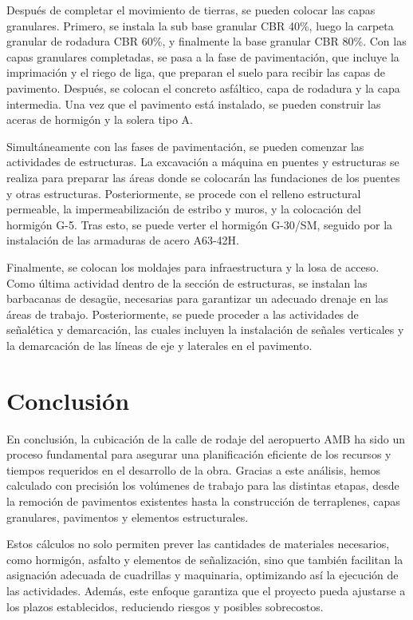 \documentclass{article} %
\begin{document}
Después de completar el movimiento de tierras, se pueden colocar las capas granulares. Primero, se instala la sub base granular CBR 40\%, luego la carpeta granular de rodadura CBR 60\%, y finalmente la base granular CBR 80\%. Con las capas granulares completadas, se pasa a la fase de pavimentación, que incluye la imprimación y el riego de liga, que preparan el suelo para recibir las capas de pavimento. Después, se colocan el concreto asfáltico, capa de rodadura y la capa intermedia. Una vez que el pavimento está instalado, se pueden construir las aceras de hormigón y la solera tipo A.

Simultáneamente con las fases de pavimentación, se pueden comenzar las actividades de estructuras. La excavación a máquina en puentes y estructuras se realiza para preparar las áreas donde se colocarán las fundaciones de los puentes y otras estructuras. Posteriormente, se procede con el relleno estructural permeable, la impermeabilización de estribo y muros, y la colocación del hormigón G-5. Tras esto, se puede verter el hormigón G-30/SM, seguido por la instalación de las armaduras de acero A63-42H.

Finalmente, se colocan los moldajes para infraestructura y la losa de acceso. Como última actividad dentro de la sección de estructuras, se instalan las barbacanas de desagüe, necesarias para garantizar un adecuado drenaje en las áreas de trabajo. Posteriormente, se puede proceder a las actividades de señalética y demarcación, las cuales incluyen la instalación de señales verticales y la demarcación de las líneas de eje y laterales en el pavimento.

\newpage
\section{Conclusión}

En conclusión, la cubicación de la calle de rodaje del aeropuerto AMB ha sido un proceso fundamental para asegurar una planificación eficiente de los recursos y tiempos requeridos en el desarrollo de la obra. Gracias a este análisis, hemos calculado con precisión los volúmenes de trabajo para las distintas etapas, desde la remoción de pavimentos existentes hasta la construcción de terraplenes, capas granulares, pavimentos y elementos estructurales.

Estos cálculos no solo permiten prever las cantidades de materiales necesarios, como hormigón, asfalto y elementos de señalización, sino que también facilitan la asignación adecuada de cuadrillas y maquinaria, optimizando así la ejecución de las actividades. Además, este enfoque garantiza que el proyecto pueda ajustarse a los plazos establecidos, reduciendo riesgos y posibles sobrecostos.
\end{document}

